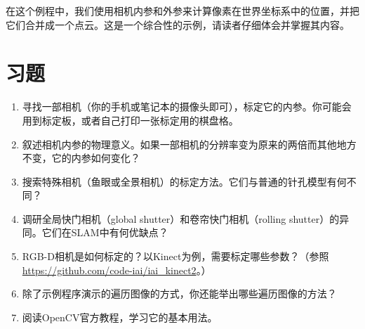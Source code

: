在这个例程中，我们使用相机内参和外参来计算像素在世界坐标系中的位置，并把它们合并成一个点云。这是一个综合性的示例，请读者仔细体会并掌握其内容。

\section*{习题}
\begin{enumerate}
	\item[\optional] 寻找一部相机（你的手机或笔记本的摄像头即可），标定它的内参。你可能会用到标定板，或者自己打印一张标定用的棋盘格。
	\item 叙述相机内参的物理意义。如果一部相机的分辨率变为原来的两倍而其他地方不变，它的内参如何变化？
	\item 搜索特殊相机（鱼眼或全景相机）的标定方法。它们与普通的针孔模型有何\mbox{不同？}
	\item 调研全局快门相机（global shutter）和卷帘快门相机（rolling shutter）的异同。它们在SLAM中有何优缺点？
	\item RGB-D相机是如何标定的？以Kinect为例，需要标定哪些参数？（参照\url{https://github.com/code-iai/iai_kinect2}。）
	\item 除了示例程序演示的遍历图像的方式，你还能举出哪些遍历图像的方法？
	\item[\optional] 阅读OpenCV官方教程，学习它的基本用法。
\end{enumerate}
